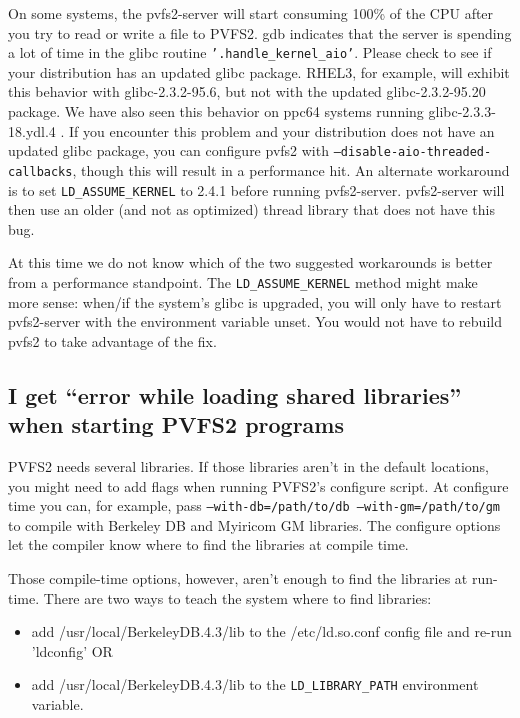 \documentclass[11pt,letterpaper]{article}
\begin{document}
On some systems, the pvfs2-server will start consuming 100\% of the CPU
after you try to read or write a file to PVFS2.  gdb indicates that the
server is spending a lot of time in the glibc routine
\texttt{'.handle\_kernel\_aio'}.  Please check to see if your
distribution has an updated glibc package.  RHEL3, for example, will
exhibit this behavior with glibc-2.3.2-95.6, but not with the updated
glibc-2.3.2-95.20 package.  We have also seen this behavior on ppc64
systems running glibc-2.3.3-18.ydl.4 .  If you encounter this problem
and your distribution does not have an updated glibc package, you can
configure pvfs2 with \texttt{--disable-aio-threaded-callbacks}, though
this will result in a performance hit.  An alternate workaround is to
set \texttt{LD\_ASSUME\_KERNEL} to 2.4.1 before running pvfs2-server.
pvfs2-server will then use an older (and not as optimized) thread
library that does not have this bug.

At this time we do not know which of the two suggested workarounds is
better from a performance standpoint.  The \texttt{LD\_ASSUME\_KERNEL}
method might make more sense:  when/if the system's glibc is
upgraded, you will only have to restart pvfs2-server with the
environment variable unset.  You would not have to rebuild pvfs2 to take
advantage of the fix.

\subsection{I get ``error while loading shared libraries'' when starting PVFS2 programs}

PVFS2 needs several libraries.  If those libraries aren't in the default
locations, you might need to add flags when running PVFS2's configure script.
At configure time you can, for example, pass \texttt{--with-db=/path/to/db
--with-gm=/path/to/gm} to compile with Berkeley DB and Myiricom GM libraries.
The configure options let the compiler know where to find the libraries at
compile time.  

Those compile-time options, however, aren't enough to find the libraries at
run-time.  There are two ways to teach the system where to find libraries:  

\begin{itemize}
\item add /usr/local/BerkeleyDB.4.3/lib to the /etc/ld.so.conf config file
  and re-run 'ldconfig' OR
\item add /usr/local/BerkeleyDB.4.3/lib to the \texttt{LD\_LIBRARY\_PATH}
    environment variable.
\end{itemize}
\end{document}
